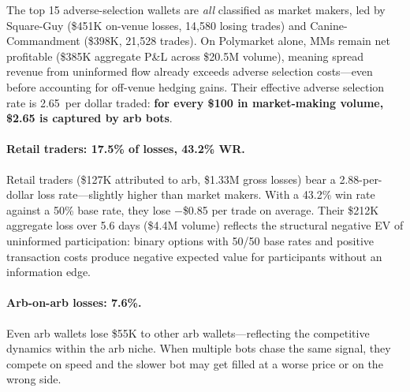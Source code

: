\documentclass[11pt,a4paper]{article}
\begin{document}
The top 15 adverse-selection wallets are \textit{all} classified as market makers, led by Square-Guy (\$451K on-venue losses, 14,580 losing trades) and Canine-Commandment (\$398K, 21,528 trades). On Polymarket alone, MMs remain net profitable (\$385K aggregate P\&L across \$20.5M volume), meaning spread revenue from uninformed flow already exceeds adverse selection costs---even before accounting for off-venue hedging gains. Their effective adverse selection rate is 2.65\textcent\ per dollar traded: \textbf{for every \$100 in market-making volume, \$2.65 is captured by arb bots}.

\paragraph{Retail traders: 17.5\% of losses, 43.2\% WR.} Retail traders (\$127K attributed to arb, \$1.33M gross losses) bear a 2.88\textcent-per-dollar loss rate---slightly higher than market makers. With a 43.2\% win rate against a 50\% base rate, they lose $-$\$0.85 per trade on average. Their \$212K aggregate loss over 5.6 days (\$4.4M volume) reflects the structural negative EV of uninformed participation: binary options with 50/50 base rates and positive transaction costs produce negative expected value for participants without an information edge.

\paragraph{Arb-on-arb losses: 7.6\%.} Even arb wallets lose \$55K to other arb wallets---reflecting the competitive dynamics within the arb niche. When multiple bots chase the same signal, they compete on speed and the slower bot may get filled at a worse price or on the wrong side.
\end{document}
